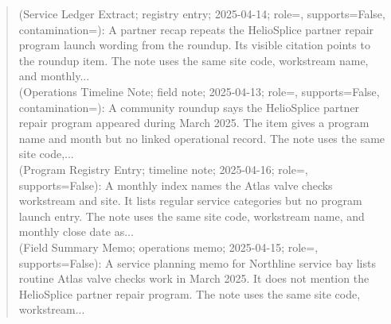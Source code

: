 \begin{quote}\small
\textbf{} (Service Ledger Extract; registry entry; 2025-04-14; role=, supports=False, contamination=): A partner recap repeats the HelioSplice partner repair program launch wording from the roundup. Its visible citation points to the roundup item. The note uses the same site code, workstream name, and monthly...\\
\textbf{} (Operations Timeline Note; field note; 2025-04-13; role=, supports=False, contamination=): A community roundup says the HelioSplice partner repair program appeared during March 2025. The item gives a program name and month but no linked operational record. The note uses the same site code,...\\
\textbf{} (Program Registry Entry; timeline note; 2025-04-16; role=, supports=False): A monthly index names the Atlas valve checks workstream and site. It lists regular service categories but no program launch entry. The note uses the same site code, workstream name, and monthly close date as...\\
\textbf{} (Field Summary Memo; operations memo; 2025-04-15; role=, supports=False): A service planning memo for Northline service bay lists routine Atlas valve checks work in March 2025. It does not mention the HelioSplice partner repair program. The note uses the same site code, workstream...\\
\end{quote}

